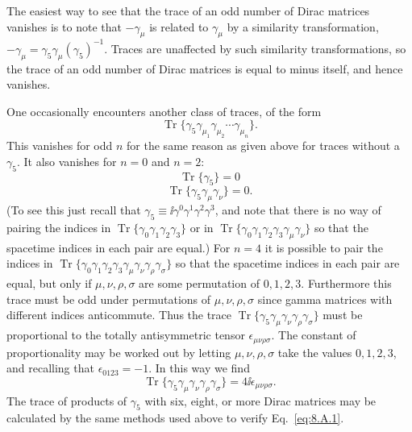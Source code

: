 The easiest way to see that the trace of an odd number of Dirac matrices
vanishes is to note that $-\gamma_\mu$ is related to $\gamma_\mu$ by a
similarity transformation,
$-\gamma_\mu=\gamma_5\gamma_\mu(\gamma_5)^{-1}$. Traces are unaffected by
such similarity transformations, so the trace of an odd number of Dirac
matrices is equal to minus itself, and hence vanishes.

One occasionally encounters another class of traces, of the form
\[
\operatorname{Tr}\{\gamma_5\gamma_{\mu_1}\gamma_{\mu_2}\cdots
\gamma_{\mu_n}\}.
\]
This vanishes for odd $n$ for the same reason as given above for traces
without a $\gamma_5$. It also vanishes for $n=0$ and $n=2$:
\begin{equation}
\operatorname{Tr}\{\gamma_5\}=0
\tag{8.A.10}\label{eq:8.A.10}
\end{equation}
\begin{equation}
\operatorname{Tr}\{\gamma_5\gamma_\mu\gamma_\nu\}=0.
\tag{8.A.11}\label{eq:8.A.11}
\end{equation}
(To see this just recall that
$\gamma_5\equiv \ii\gamma^0\gamma^1\gamma^2\gamma^3$, and note that there is no
way of pairing the indices in
$\operatorname{Tr}\{\gamma_0\gamma_1\gamma_2\gamma_3\}$ or in
$\operatorname{Tr}\{\gamma_0\gamma_1\gamma_2\gamma_3\gamma_\mu\gamma_\nu\}$
so that the spacetime indices in each pair are equal.) For $n=4$ it is
possible to pair the indices in
$\operatorname{Tr}\{\gamma_0\gamma_1\gamma_2\gamma_3
\gamma_\mu\gamma_\nu\gamma_\rho\gamma_\sigma\}$ so that the spacetime
indices in each pair are equal, but only if $\mu,\nu,\rho,\sigma$ are some
permutation of $0,1,2,3$. Furthermore this trace must be odd under
permutations of $\mu,\nu,\rho,\sigma$ since gamma matrices with different
indices anticommute. Thus the trace
$\operatorname{Tr}\{\gamma_5\gamma_\mu\gamma_\nu\gamma_\rho\gamma_\sigma\}$
must be proportional to the totally antisymmetric tensor
$\epsilon_{\mu\nu\rho\sigma}$. The constant of proportionality may be worked
out by letting $\mu,\nu,\rho,\sigma$ take the values $0,1,2,3$, and recalling
that $\epsilon_{0123}=-1$. In this way we find
\begin{equation}
\operatorname{Tr}\{\gamma_5\gamma_\mu\gamma_\nu\gamma_\rho\gamma_\sigma\}
=4\ii\epsilon_{\mu\nu\rho\sigma}.
\tag{8.A.12}\label{eq:8.A.12}
\end{equation}
The trace of products of $\gamma_5$ with six, eight, or more Dirac matrices
may be calculated by the same methods used above to verify Eq.~\eqref{eq:8.A.1}.
